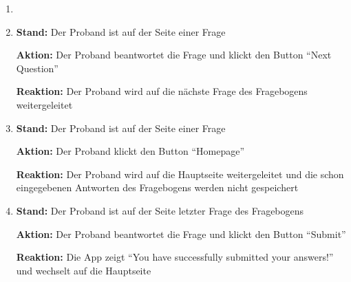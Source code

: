 \documentclass[a4paper]{scrreprt}
\begin{document}
\begin{itemize}
\begin{enumerate}
                        \par {}
                        \par {}
                        \par {}
                        \par {}
                        \item \par {}
                        \par {}
                        \par {}

	        	        \item \par \textbf{Stand: }Der Proband ist auf der Seite einer Frage
	        	        \par \textbf{Aktion: }Der Proband beantwortet die Frage und klickt den Button ``Next Question''
	        	        \par \textbf{Reaktion: }Der Proband wird auf die nächste Frage des Fragebogens weitergeleitet
	        	        \item \par \textbf{Stand: }Der Proband ist auf der Seite einer Frage
	        	        \par \textbf{Aktion: }Der Proband klickt den Button ``Homepage''
	        	        \par \textbf{Reaktion: }Der Proband wird auf die Hauptseite weitergeleitet und die schon eingegebenen Antworten des Fragebogens werden nicht gespeichert
	        	        \item \par \textbf{Stand: }Der Proband ist auf der Seite letzter Frage des Fragebogens
	        	        \par \textbf{Aktion: }Der Proband beantwortet die Frage und klickt den Button ``Submit''
	        	        \par \textbf{Reaktion: }Die App zeigt ``You have successfully submitted your answers!'' und wechselt auf die Hauptseite
	              \end{enumerate}

              \end{itemize}
	
\end{document}

